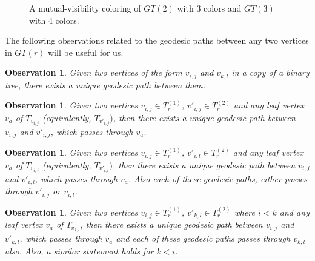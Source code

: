 \documentclass[12pt]{article}
\newtheorem{observation}[theorem]{Observation}
\begin{document}
\begin{figure}[thb]

  
    
    \caption{A mutual-visibility coloring of $GT(2)$ with $3$ colors and $GT(3)$ with $4$ colors. }
  \label{fig:mvc}
\end{figure}
The following observations related to the geodesic paths between any two vertices in $GT(r)$ will be useful for us.

\begin{observation}
Given two vertices of the form $v_{i,j}$ and $v_{k,l}$ in a copy of a binary tree, there exists a unique geodesic path between them.
\end{observation}

\begin{observation}
Given two vertices $v_{i,j}\in T^{(1)}_r$, $v'_{i,j}\in T^{(2)}_r$ and any leaf vertex $v_a$ of  $T_{v_{i,j}}$ (equivalently, $T_{v'_{i,j}})$, then there exists a unique geodesic path between $v_{i,j}$ and $v'_{i,j}$, which passes through $v_a$.
\end{observation}

\begin{observation}
    Given two vertices $v_{i,j}\in T^{(1)}_r$, $v'_{i,l}\in T^{(2)}_r$ and any leaf vertex $v_a$ of  $T_{v_{i,j}}$ (equivalently, $T_{v'_{i,l}})$, then there exists a unique geodesic path between $v_{i,j}$ and $v'_{i,l}$, which passes through $v_a$. Also each of these geodesic paths, either passes through $v'_{i,j}$ or $v_{i,l}$.
\end{observation}
\begin{observation}
    Given two vertices $v_{i,j}\in T^{(1)}_r$, $v'_{k,l}\in T^{(2)}_r$ where $i<k$ and any leaf vertex $v_a$ of  $T_{v_{k,l}}$, then there exists a unique geodesic path between $v_{i,j}$ and $v'_{k,l}$, which passes through $v_a$ and each of these geodesic paths passes through $v_{k,l}$ also. Also, a similar statement holds for $k < i$.
\end{observation}
\end{document}
